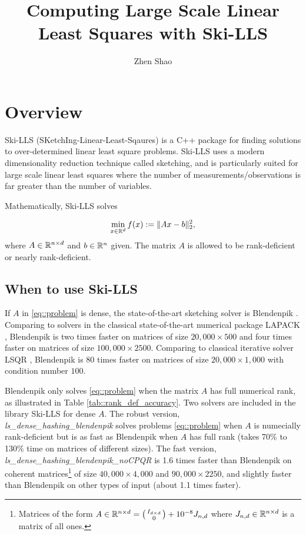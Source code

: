 \documentclass[english,11pt]{article}
\begin{document}
\title{Computing Large Scale Linear Least Squares with Ski-LLS}

\author{Zhen Shao}\maketitle

\section{Overview}

Ski-LLS (SKetchIng-Linear-Least-Sqaures) is a C++ package for finding solutions to over-determined linear least square problems. Ski-LLS uses a modern dimensionality reduction technique called sketching, and is particularly suited for large scale linear least squares where the number of measurements/observations is far greater than the number of variables. 

Mathematically, Ski-LLS solves

\begin{align}
\min_{x \in \mathbb{R}^{d}} f(x): = \|Ax - b\|_2^2, \label{eq::problem}
\end{align}
where $A \in \mathbb{R}^{n\times d}$ and $b \in \mathbb{R}^{n}$ given. The matrix $A$ is allowed to be rank-deficient or nearly rank-deficient. 

\subsection{When to use Ski-LLS}

If $A$ in \eqref{eq::problem} is dense, the state-of-the-art sketching solver is Blendenpik \cite{doi:10.1137/090767911}. Comparing to solvers in the classical state-of-the-art numerical package LAPACK \cite{laug}, Blendenpik is two times faster on matrices of size $20,000 \times 500$ and four times faster on matrices of size $100,000 \times 2500$. Comparing to classical iterative solver LSQR \cite{Paige:1982aa}, Blendenpik is 80 times faster on matrices of size $20,000 \times 1,000$ with condition number $100$. 

Blendenpik only solves \eqref{eq::problem} when the matrix $A$ has full numerical rank, as illustrated in Table \ref{tab::rank_def_accuracy}. Two solvers are included in the library Ski-LLS for dense $A$. The robust version, \\{\it{ls_dense_hashing_blendenpik} }solves problems \ref{eq::problem} when $A$ is numecially rank-deficient but is as fast as Blendenpik when $A$ has full rank (takes 70\% to 130\% time on matrices of different sizes). The fast version, {\it{ls_dense_hashing_blendenpik_noCPQR}} is 1.6 times faster than Blendenpik on coherent matrices\footnote{Matrices of the form $A \in \mathbb{R}^{n\times d} = \bigl(\begin{smallmatrix} I_{d\times d} \\ 0  \end{smallmatrix}\bigr) + 10^{-8}J_{n,d} $ where $J_{n,d} \in \mathbb{R}^{n \times d}$ is a matrix of all ones.} of size $40,000 \times 4,000$ and $90,000 \times 2250$, and slightly faster than Blendenpik on other types of input (about 1.1 times faster).
\end{document}
